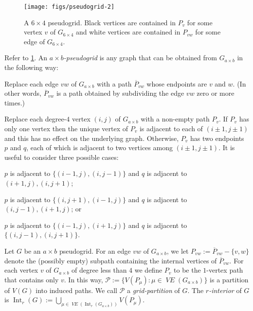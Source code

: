 \documentclass{patmorin}
\DeclareMathOperator{\interior}{Int}
\newcommand{\defin}[1]{\emph{\color{brightmaroon}#1}}
\DeclareMathOperator{\VE}{\mathit{VE}}
\begin{document}
\begin{figure}
  \begin{center}
    \texttt{[image: figs/pseudogrid-2]}
  \end{center}
  \caption{A $6\times 4$ pseudogrid.  Black vertices are contained in $P_v$ for some vertex $v$ of $G_{6\times 4}$ and white vertices are contained in $P_{vw}$ for some edge of $G_{6\times 4}$.}
  \label{pseudogrid_fig}
\end{figure}

Refer to \cref{pseudogrid_fig}.  An \defin{$a\times b$-pseudogrid} is any graph that can be obtained from $G_{a\times b}$ in the following way:
\begin{compactitem}
  \item Replace each edge $vw$ of $G_{a\times b}$ with a path $\overline{P}_{vw}$ whose endpoints are $v$ and $w$.  (In other words, $\overline{P}_{vw}$ is a path obtained by subdividing the edge $vw$ zero or more times.)
  \item Replace each degree-$4$ vertex $(i,j)$ of $G_{a\times b}$ with a non-empty path $P_v$. If $P_v$ has only one vertex then the unique vertex of $P_v$ is adjacent to each of $(i\pm 1,j\pm 1)$ and this has no effect on the underlying graph.  Otherwise, $P_v$ has two endpoints $p$ and $q$, each of which is adjacent to two vertices among $(i\pm 1,j\pm 1)$.  It is useful to consider three possible cases:
  \begin{compactenum}[(Q1)]
    \item \label{q_i} $p$ is adjacent to $\{(i-1,j), (i,j-1)\}$ and $q$ is adjacent to $(i+1,j),(i,j+1)$;
    \item \label{q_ii} $p$ is adjacent to $\{(i,j+1), (i-1,j)\}$ and $q$ is adjacent to $(i,j-1),(i+1,j)$; or
    \item \label{q_iii} $p$ is adjacent to $\{(i-1,j),(i+1,j)\}$ and $q$ is adjacent to $\{(i,j-1),(i,j+1)\}$.
  \end{compactenum}
\end{compactitem}

Let $G$ be an $a\times b$ pseudogrid.  For an edge $vw$ of $G_{a\times b}$, we let $P_{vw}:=\overline{P}_{vw}-\{v,w\}$ denote the (possibly empty) subpath containing the internal vertices of $\overline{P}_{vw}$.  For each vertex $v$ of $G_{a\times b}$ of degree less than $4$ we define $P_{v}$ to be the $1$-vertex path that contains only $v$.  In this way, $\mathcal{P}:=\{V(P_\mu):\mu\in \VE(G_{a\times b})\}$ is a partition of $V(G)$ into induced paths.  We call $\mathcal{P}$ a \defin{grid-partition} of $G$.
The \defin{$r$-interior} of $G$ is $\interior_r(G):=\bigcup_{\mu\in\VE(\interior_r(G_{a\times b}))} V(P_\mu)$.
\end{document}
